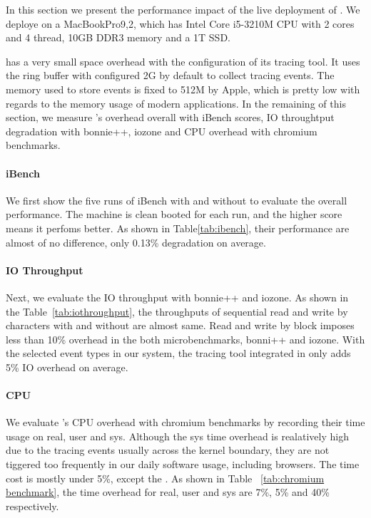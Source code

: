 In this section we present the performance impact of the live deployment of
\xxx. We deploye \xxx on a MacBookPro9,2, which has Intel Core i5-3210M CPU with
2 cores and 4 thread, 10GB DDR3 memory and a 1T SSD.

\xxx has a very small space overhead with the configuration of its tracing
tool. It uses the ring buffer with configured 2G by default to collect tracing
events. The memory used to store events is fixed to 512M by Apple, which is pretty
low with regards to the memory usage of modern applications. In the remaining
of this section, we measure \xxx's overhead overall with iBench scores, IO
throughtput degradation with bonnie++, iozone and CPU overhead with chromium
benchmarks.

\paragraph{iBench}

We first show the five runs of iBench with and without \xxx to evaluate the
overall performance. The machine is clean booted for each run, and the higher
score means it perfoms better. As shown in Table\ref{tab:ibench}, their
performance are almost of no difference, only 0.13\% degradation on average.

\paragraph{IO Throughput}

Next, we evaluate the IO throughput with bonnie++ and iozone. As shown in the
Table~\ref{tab:iothroughput}, the throughputs of sequential read and write
by characters with and without \xxx are almost same. Read and write by block
imposes less than 10\% overhead in the both microbenchmarks, bonni++ and iozone.
With the selected event types in our system, the tracing tool integrated in \xxx
only adds 5\% IO overhead on average.


\paragraph{CPU}

We evaluate \xxx's CPU overhead with chromium benchmarks by recording their time
usage on real, user and sys. Although the sys time overhead is realatively
high due to the tracing events usually across the kernel boundary, they are not
tiggered too frequently in our daily software usage, including browsers. The
time cost is mostly under 5\%, except the . As
shown in Table ~\ref{tab:chromium benchmark}, the time overhead for real, user
and sys are 7\%, 5\% and 40\% respectively.

